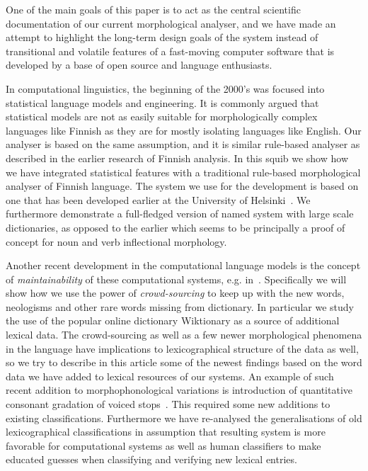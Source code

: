 \documentclass[a4paper,12pt]{article}
\begin{document}
One of the main goals of this paper is to act as the central scientific
documentation of our current morphological analyser, and we have made an
attempt to highlight the long-term design goals of the system instead of
transitional and volatile features of a fast-moving computer software that is
developed by a base of open source and language enthusiasts.

In computational linguistics, the beginning of the 2000's was focused into
statistical language models and engineering. It is commonly argued that
statistical models are not as easily suitable for morphologically complex
languages like Finnish as they are for mostly isolating languages like English.
Our analyser is based on the same assumption, and it is similar rule-based
analyser as described in the earlier research of Finnish analysis. In this
squib we show how we have integrated statistical features with a traditional
rule-based morphological analyser of Finnish language. The system we use for
the development is based on one that has been developed earlier at the
University of Helsinki~\citep{pirinen2008suomen}. We furthermore demonstrate a
full-fledged version of named system with large scale dictionaries, as opposed
to the earlier which seems to be principally a proof of concept for noun and
verb inflectional morphology.

Another recent development in the computational language models is the concept
of \emph{maintainability} of these computational systems, e.g.
in~\cite{maxwell2008joint,pirinen2011modularisation}. Specifically we will show
how we use the power of \emph{crowd-sourcing} to keep up with the new words,
neologisms and other rare words missing from dictionary. In particular we study
the use of the popular online dictionary Wiktionary as a source of additional
lexical data. The crowd-sourcing as well as a few newer morphological phenomena
in the language have implications to lexicographical structure of the data as
well, so we try to describe in this article some of the newest findings based
on the word data we have added to lexical resources of our systems. An example
of such recent addition to morphophonological variations is introduction of
quantitative consonant gradation of voiced stops~\cite[§ 41]{visk}. This
required some new additions to existing classifications. Furthermore we have
re-analysed the generalisations of old lexicographical classifications in
assumption that resulting system is more favorable for computational systems as
well as human classifiers to make educated guesses when classifying and
verifying new lexical entries.
\end{document}
